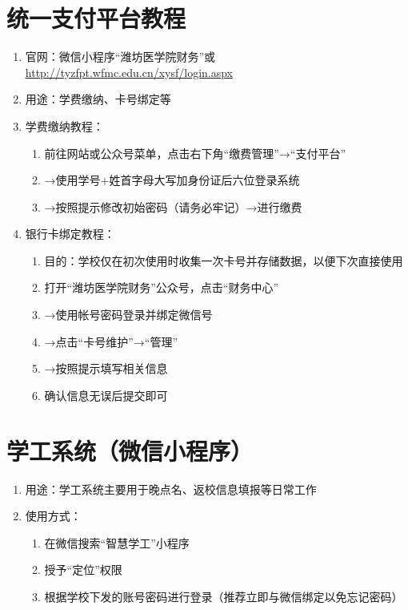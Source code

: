 \section[统一支付平台教程]{统一支付平台教程}
\label{fee_pay}
\begin{enumerate}
      \item 官网：微信小程序“潍坊医学院财务”或\uline{\href{http://tyzfpt.wfmc.edu.cn/xysf/login.aspx}{http://tyzfpt.wfmc.edu.cn/xysf/login.aspx}}
      \item 用途：学费缴纳、卡号绑定等
      \item 学费缴纳教程：
            \begin{enumerate}
                  \item 前往网站或公众号菜单，点击右下角“缴费管理”→“支付平台”
                  \item →使用学号+姓首字母大写加身份证后六位登录系统
                  \item →按照提示修改初始密码（请务必牢记）→进行缴费
            \end{enumerate}
      \item 银行卡绑定教程：
            \begin{enumerate}
                  \item 目的：学校仅在初次使用时收集一次卡号并存储数据，以便下次直接使用\footnotemark
                  \item 打开“潍坊医学院财务”公众号，点击“财务中心”
                  \item →使用帐号密码登录\footnotemark 并绑定微信号
                  \item →点击“卡号维护”→“管理”
                  \item →按照提示填写相关信息
                  \item 确认信息无误后提交即可
            \end{enumerate}
\end{enumerate}

\section[学工系统（微信小程序）]{学工系统（微信小程序）}
\begin{enumerate}
      \item 用途：学工系统主要用于晚点名、返校信息填报等日常工作\footnotemark
      \item 使用方式：
            \begin{enumerate}
                  \item 在微信搜索“智慧学工”小程序
                  \item 授予“定位”权限
                  \item 根据学校下发的账号密码进行登录（推荐立即与微信绑定以免忘记密码）
            \end{enumerate}
\end{enumerate}

